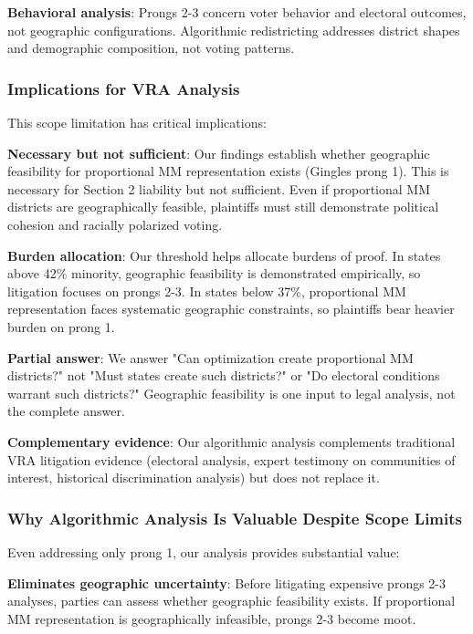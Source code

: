 \textbf{Behavioral analysis}: Prongs 2-3 concern voter behavior and electoral outcomes, not geographic configurations. Algorithmic redistricting addresses district shapes and demographic composition, not voting patterns.

\subsubsection{Implications for VRA Analysis}

This scope limitation has critical implications:

\textbf{Necessary but not sufficient}: Our findings establish whether geographic feasibility for proportional MM representation exists (Gingles prong 1). This is necessary for Section 2 liability but not sufficient. Even if proportional MM districts are geographically feasible, plaintiffs must still demonstrate political cohesion and racially polarized voting.

\textbf{Burden allocation}: Our threshold helps allocate burdens of proof. In states above 42\% minority, geographic feasibility is demonstrated empirically, so litigation focuses on prongs 2-3. In states below 37\%, proportional MM representation faces systematic geographic constraints, so plaintiffs bear heavier burden on prong 1.

\textbf{Partial answer}: We answer "Can optimization create proportional MM districts?" not "Must states create such districts?" or "Do electoral conditions warrant such districts?" Geographic feasibility is one input to legal analysis, not the complete answer.

\textbf{Complementary evidence}: Our algorithmic analysis complements traditional VRA litigation evidence (electoral analysis, expert testimony on communities of interest, historical discrimination analysis) but does not replace it.

\subsubsection{Why Algorithmic Analysis Is Valuable Despite Scope Limits}

Even addressing only prong 1, our analysis provides substantial value:

\textbf{Eliminates geographic uncertainty}: Before litigating expensive prongs 2-3 analyses, parties can assess whether geographic feasibility exists. If proportional MM representation is geographically infeasible, prongs 2-3 become moot.

